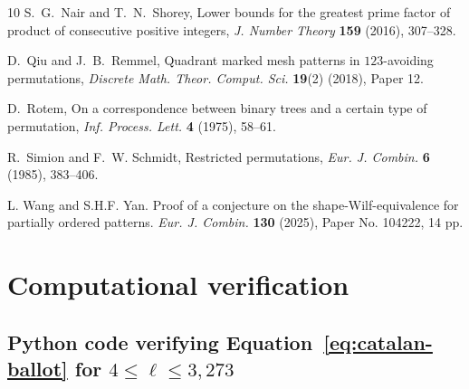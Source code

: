 \documentclass[11pt]{article}
\begin{document}
\begin{thebibliography}{10}
S.~G.~Nair and T.~N.~Shorey,
Lower bounds for the greatest prime factor of product of consecutive positive integers,
\emph{J. Number Theory} \textbf{159} (2016), 307--328.

D.~Qiu and J.~B.~Remmel,
Quadrant marked mesh patterns in $123$-avoiding permutations,
\emph{Discrete Math. Theor. Comput. Sci.} \textbf{19}(2) (2018), Paper 12.

D.~Rotem,
On a correspondence between binary trees and a certain type of permutation,
{\em Inf. Process. Lett.}
{\bf 4} (1975), 58--61.


R.~Simion and F.~W. Schmidt,
Restricted permutations,
{\em Eur. J. Combin.}
{\bf 6} (1985), 383--406.

 L. Wang and S.H.F. Yan. 
Proof of a conjecture on the shape-Wilf-equivalence for partially ordered patterns. 
{\em Eur. J. Combin.} {\bf 130} (2025), Paper No. 104222, 14 pp.

\end{thebibliography}	
\newpage
\appendix
\section{Computational verification}
\subsection{Python code verifying Equation~\eqref{eq:catalan-ballot} for $4\le \ell\le 3{,}273$}
\label{code:equation}
\end{document}
